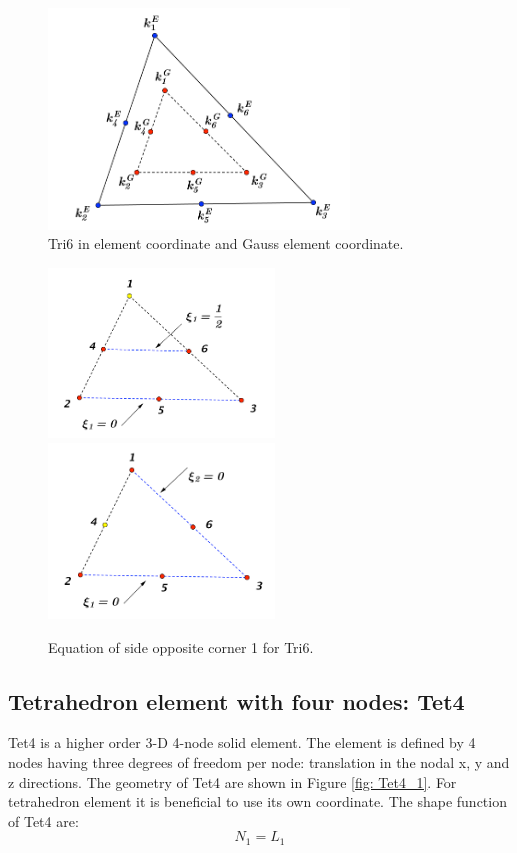 \begin{figure}[h]
	\begin{center}
		\includegraphics[width=8cm,clip]{Tri6_1.pdf} 		
		\caption{Tri6 in element coordinate and Gauss element coordinate.} \label{fig: Tri6_1}	
	\end{center} 
\end{figure}

\begin{figure}[h]
	\begin{center}
		\includegraphics[width=6cm,clip]{Tri6_2.pdf}		
		\includegraphics[width=6cm,clip]{Tri6_3.pdf}		
		\caption{Equation of side opposite corner 1 for Tri6.} \label{fig: Tri6_2}
		
	\end{center} 
\end{figure}


\subsection{Tetrahedron element with four nodes: Tet4}
Tet4 is a higher order 3-D 4-node solid element. The element is defined by 4 nodes having three degrees of freedom per node: translation in the nodal x, y and z directions. The geometry of Tet4 are shown in Figure \ref{fig: Tet4_1}. For tetrahedron element it is beneficial to use its own coordinate. The shape function of Tet4 are:
\begin{equation}
N_1 = L_1
\end{equation}

